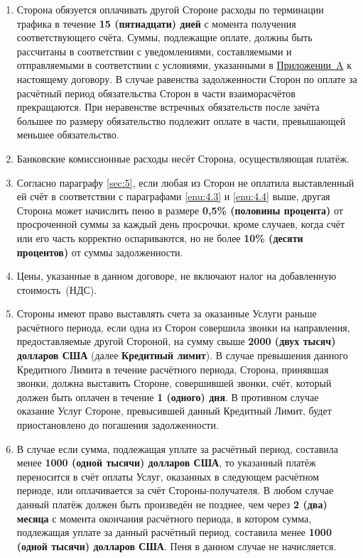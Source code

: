 \begin{Form}
\begin{enumerate}[label=\thesection.\arabic*.]
{           дней} по окончании расчётного периода направляет другой Стороне счёт. Все суммы в счетах
           указываются в долларах США.\label{enu:4.3}
      \item Сторона  обязуется оплачивать другой Стороне  расходы по терминации трафика в течение \textbf{15 (пятнадцати)
            дней} с момента получения соответствующего счёта. Суммы, подлежащие оплате, должны быть рассчитаны в
            соответствии с уведомлениями, составляемыми и отправляемыми в соответствии с условиями,
            указанными в \hyperref[anx:a-ru]{\flqq{}Приложении~A\frqq{}} к настоящему договору.
            В случае равенства задолженности Сторон по оплате за расчётный период обязательства
            Сторон в части взаиморасчётов прекращаются.
            При неравенстве встречных обязательств после зачёта большее по размеру обязательство подлежит
            оплате в части, превышающей меньшее обязательство.\label{enu:4.4}
       \item Банковские комиссионные расходы несёт Сторона, осуществляющая платёж. \label{enu:4.5}
       \item Согласно параграфу \ref{sec:5}, если любая из Сторон не оплатила выставленный ей счёт в соответствии с параграфами
            \ref{enu:4.3} и \ref{enu:4.4} выше, другая Сторона может начислить пеню в размере \textbf{0,5\% (половины процента)}
             от просроченной суммы за каждый день просрочки, кроме случаев, когда счёт или его часть
             корректно оспариваются, но не более \textbf{10\% (десяти процентов)} от суммы задолженности.\label{enu:4.6}
       \item Цены, указанные в данном договоре, не включают налог на добавленную стоимость~(НДС).
       \item Стороны имеют право выставлять счета за оказанные Услуги раньше
                расчётного периода, если одна из Сторон совершила звонки на
                направления, предоставляемые другой Стороной, на сумму свыше \textbf{2000 (двух тысяч) долларов США}
                (далее \textbf{\flqq{}Кредитный лимит\frqq}).
                В случае превышения данного Кредитного Лимита в течение расчётного
                периода, Сторона, принявшая звонки, должна выставить Стороне, совершившей звонки, счёт, который
                должен быть оплачен в течение \textbf{1 (одного) дня}. В противном случае оказание
                Услуг Стороне, превысившей данный Кредитный Лимит, будет приостановлено до
                погашения задолженности.
       \item В случае если сумма, подлежащая уплате за расчётный период, составила менее \textbf{1000 (одной тысячи) долларов США},
             то указанный платёж переносится в счёт оплаты Услуг, оказанных в следующем расчётном периоде,
             или оплачивается за счёт Стороны-получателя. В любом случае данный платёж должен быть произведён не позднее,
             чем через \textbf{2 (два) месяца} с момента окончания расчётного периода, в котором сумма, подлежащая уплате за
             данный расчётный период, составила менее \textbf{1000 (одной тысячи) долларов США}\@. Пеня в данном случае не начисляется.
      \end{enumerate}



\end{Form}
